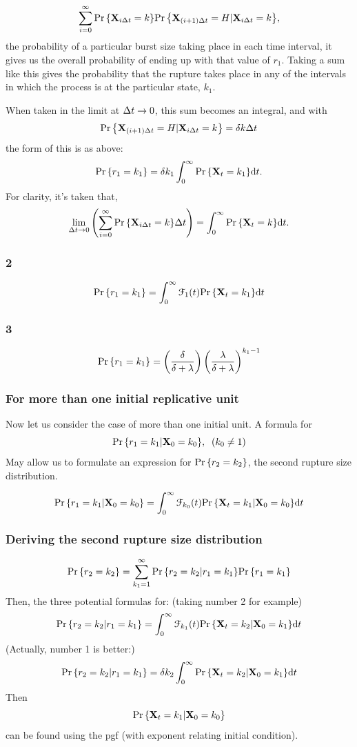 $$\sum_{i=0}^\infty {\text{Pr}\left\{{\bf X}_{i\Delta t} = k\right\}}{\text{Pr}\left\{{\bf X}_{(i+1)\Delta t} = H|{\bf X}_{i\Delta t} = k\right\}},$$
the probability of a particular burst size taking place in each time interval, it gives us the overall probability of ending up with that value of $r_1$. Taking a sum like this gives the probability that the rupture takes place in any of the intervals in which the process is at the particular state, $k_1$.\par
When taken in the limit at $\Delta t \to 0$, this sum becomes an integral, and with 
$${\text{Pr}\left\{{\bf X}_{(i+1)\Delta t} = H|{\bf X}_{i\Delta t} = k\right\}} = \delta k \Delta t$$
the form of this is as above:
$${\text{Pr}\left\{r_1 = k_1\right\}} = \delta k_1\int_0^{\infty}{{\text{Pr}\left\{{{\bf X}_t} = k_1\right\}}}{\rm d} t.$$
For clarity, it's taken that,
$$\lim_{\Delta t\to0}\left(\sum^\infty_{i=0} {\text{Pr}\left\{{\bf X}_{i\Delta t} = k\right\}} \Delta t\right) = \int^{\infty}_0  {\text{Pr}\left\{{\bf X}_{t} = k\right\}} {\rm d} t.$$


\subsubsection*{2}
$${\text{Pr}\left\{r_1 = k_1\right\}} = \int_0^{\infty}{\mathcal{F}_{1}(t){\text{Pr}\left\{{{\bf X}_t} = k_1\right\}}}{\rm d} t$$


\subsubsection*{3}

$${\text{Pr}\left\{r_1 = k_1\right\}} =  \left(\frac{\delta}{\delta + \lambda}\right) \left(\frac{\lambda}{\delta + \lambda}\right)^{k_1-1}$$


\subsubsection*{For more than one initial replicative unit}

Now let us consider the case of more than one initial unit. A formula for 
$${\text{Pr}\left\{r_1 = k_1| {\bf X}_0 = k_0\right\}}, \;\; (k_0\neq 1)$$
May allow us to formulate an expression for ${\text{Pr}\left\{r_2 = k_2\right\}}$, the second rupture size distribution.


$${\text{Pr}\left\{r_1 = k_1| {\bf X}_0 = k_0\right\}} = \int_0^{\infty}{\mathcal{F}_{k_0}(t){\text{Pr}\left\{{{\bf X}_t} = k_1| {\bf X}_0 = k_0\right\}}}{\rm d} t$$



\subsubsection{Deriving the second rupture size distribution}

$${\text{Pr}\left\{r_2 = k_2\right\}} = \sum^{\infty}_{k_1 = 1} {\text{Pr}\left\{r_2 = k_2 | r_1 = k_1\right\}} {\text{Pr}\left\{r_1 = k_1\right\}}$$
Then, the three potential formulas for: (taking number 2 for example)
$${\text{Pr}\left\{r_2 = k_2| r_1 = k_1\right\}} = \int_0^{\infty}{\mathcal{F}_{k_1}(t){\text{Pr}\left\{{{\bf X}_t} = k_2| {\bf X}_0 = k_1\right\}}}{\rm d} t$$
(Actually, number 1 is better:)
$${\text{Pr}\left\{r_2 = k_2| r_1 = k_1\right\}}  = \delta k_2 \int_0^{\infty}{\text{Pr}\left\{{{\bf X}_t} = k_2 | {\bf X}_0 = {k_1}\right\}}{\rm d} t$$
Then
$${\text{Pr}\left\{{{\bf X}_t} = k_1| {\bf X}_0 = k_0\right\}}$$
can be found using the pgf (with exponent relating initial condition).\\

